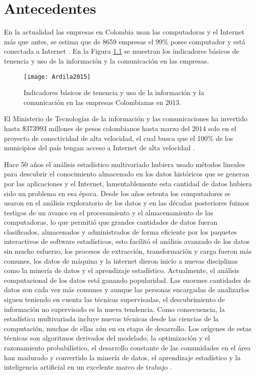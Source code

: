 \chapter{Antecedentes}

En la actualidad las empresas en Colombia usan las computadoras y el Internet más que antes, se estima que de 8659 empresas el 99\% posee computador y está conectada a Internet \cite{Ardila2015}. En la Figura \ref{Ardila2015} se muestran los indicadores básicos de tenencia y uso de la información y la comunicación en las empresas. 
\begin{figure}[ht]
\centering
\texttt{[image: Ardila2015]}
\caption{Indicadores básicos de tenencia y uso de la información y la comunicación en las empresas Colombianas en 2013.}
\label{Ardila2015}
\end{figure}
	
El Ministerio de Tecnologías de la información y las comunicaciones ha invertido hasta \$373993 millones de pesos colombianos hasta marzo del 2014 solo en el proyecto de conectividad de alta velocidad, el cual busca que el 100\% de los municipios del país tengan acceso a Internet de alta velocidad \cite{Comunicaciones2014}. 

Hace 50 años el análisis estadístico multivariado hubiera usado métodos lineales para descubrir el conocimiento almacenado en los datos históricos que se generan por las aplicaciones y el Internet, lamentablemente esta cantidad de datos hubiera sido un problema en esa época. Desde los años setenta los computadores se usaron en el análisis exploratorio de los datos y en las décadas posteriores fuimos testigos de un avance en el procesamiento y el almacenamiento de las computadoras, lo que permitió que grandes cantidades de datos fueran clasificados, almacenados y administrados de forma eficiente por los paquetes interactivos de software estadísticos, esto facilitó el análisis avanzado de los datos sin mucho esfuerzo, los procesos de extracción, transformación y carga fueron más comunes, los datos de máquina y la internet dieron inicio a nuevas disciplinas como la minería de datos y el aprendizaje estadístico. Actualmente, el análisis computacional de los datos está ganando popularidad. Las enormes cantidades de datos son cada vez más comunes y aunque las personas encargadas de analizarlos siguen teniendo en cuenta las técnicas supervisadas,  el descubrimiento de información no supervisado es la nueva tendencia. Como consecuencia, la estadística multivariada incluye nuevas técnicas desde las ciencias de la computación, muchas de ellas aún en su etapa de desarrollo. Los orígenes de estas técnicas son algoritmos derivados del modelado, la optimización y el razonamiento probabilístico, el desarrollo constante de las comunidades en el área han madurado y convertido la minería de datos, el aprendizaje estadístico y la inteligencia artificial en un excelente marco de trabajo \cite{Hastie2009}.

